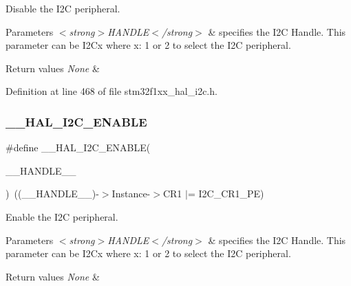 Disable the I2C peripheral. 


\begin{DoxyParams}{Parameters}
{\em $<$strong$>$\+H\+A\+N\+D\+L\+E$<$/strong$>$} & specifies the I2C Handle. This parameter can be I2\+Cx where x\+: 1 or 2 to select the I2C peripheral. \\
\hline
\end{DoxyParams}

\begin{DoxyRetVals}{Return values}
{\em None} & \\
\hline
\end{DoxyRetVals}


Definition at line 468 of file stm32f1xx\+\_\+hal\+\_\+i2c.\+h.

\mbox{\label{group___i2_c___exported___macros_gacff412c47b0c1d63ef3b2a07f65988b7}} 
\subsubsection{\texorpdfstring{\+\_\+\+\_\+\+H\+A\+L\+\_\+\+I2\+C\+\_\+\+E\+N\+A\+B\+LE}{\_\_HAL\_I2C\_ENABLE}}
{\footnotesize\ttfamily \#define \+\_\+\+\_\+\+H\+A\+L\+\_\+\+I2\+C\+\_\+\+E\+N\+A\+B\+LE(\begin{DoxyParamCaption}\item[{}]{\+\_\+\+\_\+\+H\+A\+N\+D\+L\+E\+\_\+\+\_\+ }\end{DoxyParamCaption})~((\+\_\+\+\_\+\+H\+A\+N\+D\+L\+E\+\_\+\+\_\+)-\/$>$Instance-\/$>$C\+R1 $\vert$=  I2\+C\+\_\+\+C\+R1\+\_\+\+PE)}



Enable the I2C peripheral. 


\begin{DoxyParams}{Parameters}
{\em $<$strong$>$\+H\+A\+N\+D\+L\+E$<$/strong$>$} & specifies the I2C Handle. This parameter can be I2\+Cx where x\+: 1 or 2 to select the I2C peripheral. \\
\hline
\end{DoxyParams}

\begin{DoxyRetVals}{Return values}
{\em None} & \\
\hline
\end{DoxyRetVals}


